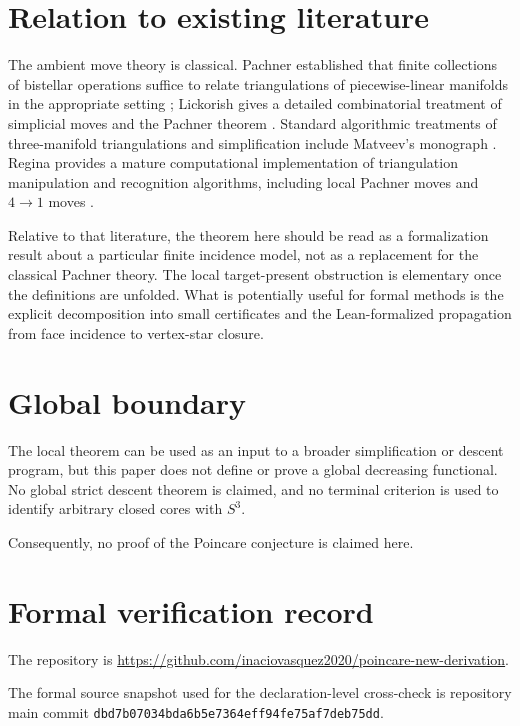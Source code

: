\documentclass[11pt]{article}
\theoremstyle{definition}
\theoremstyle{remark}
\begin{document}
\section{Relation to existing literature}

The ambient move theory is classical.  Pachner established that finite
collections of bistellar operations suffice to relate triangulations of
piecewise-linear manifolds in the appropriate setting \cite{Pachner1991};
Lickorish gives a detailed combinatorial treatment of simplicial moves and
the Pachner theorem \cite{Lickorish1999}.  Standard algorithmic treatments
of three-manifold triangulations and simplification include Matveev's
monograph \cite{Matveev2007}.  Regina provides a mature computational
implementation of triangulation manipulation and recognition algorithms,
including local Pachner moves and $4\to1$ moves
\cite{Burton2013,Regina2004}.

Relative to that literature, the theorem here should be read as a
formalization result about a particular finite incidence model, not as a
replacement for the classical Pachner theory.  The local target-present
obstruction is elementary once the definitions are unfolded.  What is
potentially useful for formal methods is the explicit decomposition into
small certificates and the Lean-formalized propagation from face incidence
to vertex-star closure.

\section{Global boundary}

The local theorem can be used as an input to a broader simplification or
descent program, but this paper does not define or prove a global decreasing
functional.  No global strict descent theorem is claimed, and no terminal
criterion is used to identify arbitrary closed cores with $S^3$.

Consequently, no proof of the Poincare conjecture is claimed here.
\section{Formal verification record}

The repository is
\url{https://github.com/inaciovasquez2020/poincare-new-derivation}.

The formal source snapshot used for the declaration-level cross-check is
repository main commit
\texttt{\small dbd7b07034bda6b5e7364eff94fe75af7deb75dd}.
\end{document}
